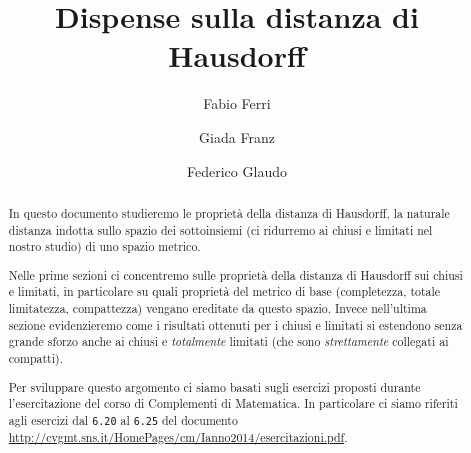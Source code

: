 \documentclass[a4paper,12pt]{article}
\title{Dispense sulla distanza di Hausdorff}
\author{Fabio Ferri \and Giada Franz \and Federico Glaudo}
\begin{document}
\maketitle


\begin{abstract}
	In questo documento studieremo le proprietà della distanza di Hausdorff, la naturale distanza indotta sullo spazio dei sottoinsiemi (ci ridurremo ai chiusi e limitati nel nostro studio) di uno spazio metrico. 
	
	Nelle prime sezioni ci concentremo sulle proprietà della distanza di Hausdorff sui chiusi e limitati, in particolare su quali proprietà del metrico di base (completezza, totale limitatezza, compattezza) vengano ereditate da questo spazio. 
	Invece nell'ultima sezione evidenzieremo come i risultati ottenuti per i chiusi e limitati si estendono senza grande sforzo anche ai chiusi e \emph{totalmente} limitati (che sono \emph{strettamente} collegati ai compatti).

	Per sviluppare questo argomento ci siamo basati sugli esercizi proposti durante l'esercitazione del corso di Complementi di Matematica. In particolare ci siamo riferiti agli esercizi dal \texttt{6.20} al \texttt{6.25} del documento \url{http://cvgmt.sns.it/HomePages/cm/Ianno2014/esercitazioni.pdf}.
\end{abstract}
\clearpage






\end{document}
